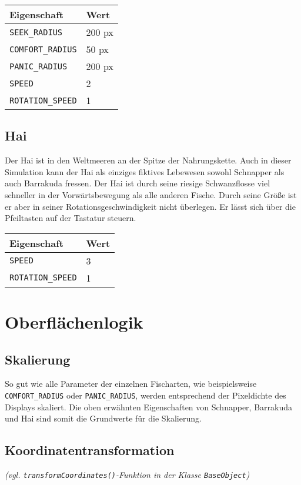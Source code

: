 \documentclass[11pt]{article}
\begin{document}
\begin{tabular}{|l|l|}
\hline
	\textbf{Eigenschaft} & \textbf{Wert}\\
\hline
\hline
	\lstinline[]$SEEK_RADIUS$  & 200 px\\
\hline
	\lstinline[]$COMFORT_RADIUS$ & 50 px\\
\hline
	\lstinline[]$PANIC_RADIUS$ & 200 px\\
\hline
	\lstinline[]$SPEED$ & 2\\
\hline
	\lstinline[]$ROTATION_SPEED$ & 1\\
\hline
\end{tabular}

\subsection{Hai}
Der Hai ist in den Weltmeeren an der Spitze der Nahrungskette. Auch in dieser Simulation kann der Hai als einziges fiktives Lebewesen sowohl Schnapper als auch Barrakuda fressen. Der Hai ist durch seine riesige Schwanzflosse viel schneller in der Vorwärtsbewegung als alle anderen Fische. Durch seine Größe ist er aber in seiner Rotationsgeschwindigkeit nicht überlegen. Er lässt sich über die Pfeiltasten auf der Tastatur steuern.\\

\begin{tabular}{|l|l|}
\hline
	\textbf{Eigenschaft} & \textbf{Wert}\\
\hline
\hline
	\lstinline[]$SPEED$ & 3\\
\hline
	\lstinline[]$ROTATION_SPEED$ & 1\\
\hline
\end{tabular}

\section{Oberflächenlogik}
\subsection{Skalierung}
So gut wie alle Parameter der einzelnen Fischarten, wie beispielsweise \lstinline[]$COMFORT_RADIUS$ oder \lstinline[]$PANIC_RADIUS$, werden entsprechend der Pixeldichte des Displays skaliert. Die oben erwähnten Eigenschaften von Schnapper, Barrakuda und Hai sind somit die Grundwerte für die Skalierung.

\subsection{Koordinatentransformation}
\textit{(vgl. \lstinline{transformCoordinates()}-Funktion in der Klasse \lstinline{BaseObject})}
\end{document}
